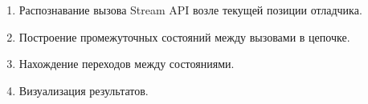 \begin{frame}
\frametitle{\insertsection} 
\framesubtitle{\insertsubsection}
\begin{enumerate}
	\item Распознавание вызова Stream API возле текущей позиции отладчика.
	\item Построение промежуточных состояний между вызовами в цепочке.
	\item Нахождение переходов между состояниями.
	\item Визуализация результатов.
\end{enumerate}
\end{frame}
